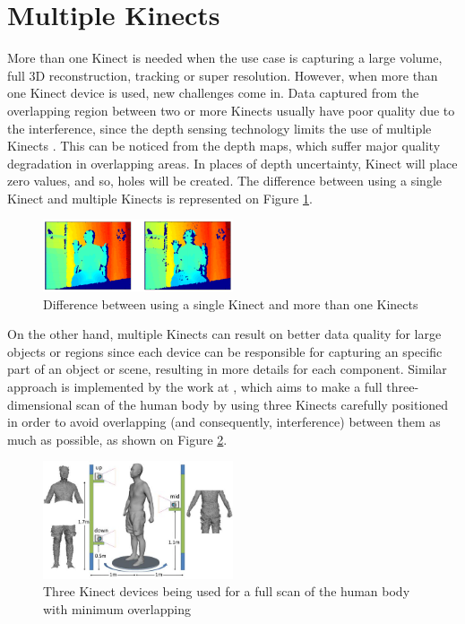 \documentclass[msc, a4paper, classic, en]{ufbathesis}
\begin{document}
\section{Multiple Kinects}

More than one Kinect is needed when the use case is capturing a large volume, full 3D reconstruction, tracking or super resolution. 
However, when more than one Kinect device is used, new challenges come in. Data captured from the overlapping region between two or more Kinects usually have poor quality due to the interference, since the depth sensing technology limits the use of multiple Kinects \cite{roy}. This can be noticed from the depth maps, which suffer major quality degradation in overlapping areas. In places of depth uncertainty, Kinect will place zero values, and so, holes will be created. The difference between using a single Kinect and multiple Kinects is represented on Figure \ref{fig:twokin}. 

\begin{figure}
\centering
\includegraphics[width=0.5\textwidth]{images/twokin.png}
\caption{Difference between using a single Kinect and more than one Kinects}
\label{fig:twokin}
\end{figure}

On the other hand, multiple Kinects can result on better data quality for large objects or regions since each device can be responsible for capturing an specific part of an object or scene, resulting in more details for each component. Similar approach is implemented by the work at \cite{tong}, which aims to make a full three-dimensional scan of the human body by using three Kinects carefully positioned in order to avoid overlapping (and consequently, interference) between them as much as possible, as shown on Figure \ref{fig:3kin}.

\begin{figure}
\centering
\includegraphics[width=0.5\textwidth]{images/3kin.jpg}
\caption{Three Kinect devices being used for a full scan of the human body with minimum overlapping \cite{tong}}
\label{fig:3kin}
\end{figure}
\end{document}
